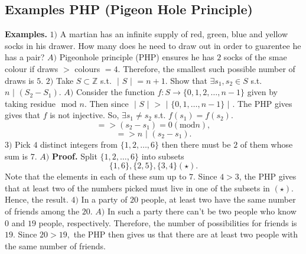 \documentclass{article}
\begin{document}
\subsection{Examples PHP (Pigeon Hole Principle)}
\textbf{Examples. }
\newline
\newline
$1) $ A martian has an infinite supply of red, green, blue and yellow
socks in his drawer. How many does he need to draw out in order to guarentee
he has a pair?
\newline
\newline
$A) $ Pigeonhole principle (PHP) ensures he has $2$ socks of the smae colour if draws $ > $ colours $ = 4$.
Therefore, the smallest such possible number of draws is $5.$
\newline
\newline
$2) $ Take $S \subset \mathbb{Z}$ s.t. $\text{ | } S \text{ | } = n + 1.$ Show that 
$\exists s_1, s_2 \in S$ s.t. $n \text{ | } (S_2 - S_1).$
\newline
\newline
$A) $ Consider the function $f: S \rightarrow \{ 0, 1, 2, \dots , n - 1\}$ given by taking residue 
$\text{ mod } n$. Then since $\text{ | } S \text{ | } > \text{ | } \{ 0, 1, \dots , n - 1\}\text{ | }$. The PHP gives 
gives that $f$ is not injective. So, $\exists s_1 \not = s_2$ s.t. $f(s_1) = f(s_2).$
$$ => (s_2 - s_1) = 0 (\text{mod} n),$$
$$ => n \text{ | } (s_2 - s_1).$$
$3) $ Pick $4$ distinct integers from $\{ 1, 2, \dots, 6 \}$ then there must be $2$ of them whose sum is $7$.
\newline
\newline
$A) $ \textbf{Proof. } Split $\{ 1, 2, \dots , 6\}$ into subsets 
$$\{ 1, 6\}, \{ 2, 5\}, \{ 3, 4 \} (\star).$$
Note that the elements in each of these sum up to $7$. Since $4 > 3$, the PHP gives that at least two
of the numbers picked must live in one of the subsets in $(\star)$. Hence, the result.
\newline
\newline
$4) $ In a party of $20$ people, at least two have the same number of friends among the $20$. 
\newline
\newline
$A) $ In such a party there can't be two people who know $0$ and $19$ people, respectively. 
\newline 
Therefore, the number of possibilities for friends is $19$. 
\newline
Since $20 > 19,$ the PHP then gives us that there are at least two people with the same number of friends.
\end{document}
